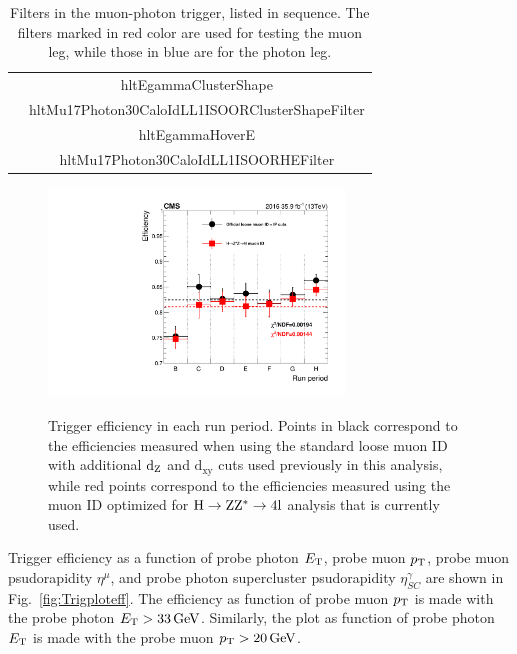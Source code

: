 \begin{table}[p]
\begin{center}
\begin{tabular}{ |c|c| }
		                  &  hltEgammaClusterShape\\
		                  &  hltMu17Photon30CaloIdLL1ISOORClusterShapeFilter\\
		                  &  hltEgammaHoverE\\
		                  &  \color{blue} hltMu17Photon30CaloIdLL1ISOORHEFilter\\
		 \hline
		\end{tabular}
		\caption[Filters]{
		 Filters in the muon-photon trigger, listed in sequence. The filters marked in red
		 color are used for testing the muon leg, while those in blue are for the photon leg.  \label{table:Filters}}
		\end{center}                                                                                                                                       
		\end{table} 
		
		\begin{figure}[p]
		  \centering
		    \includegraphics[width=0.7\textwidth]{Fig/Trigger/EffByRuns_HZZ}\\
		    \caption{\label{fig:EffInRun}
		        Trigger efficiency in each run period. Points in black correspond to the efficiencies measured when using the standard loose muon ID with additional $\text{d}_{\mathrm{Z}}$ and $\text{d}_{\text{xy}}$ cuts used previously in this analysis, while red points correspond to the efficiencies measured using the muon ID optimized for $\mathrm{H}\rightarrow \mathrm{Z}\mathrm{Z}^{*}\rightarrow 4\text{l}$ analysis that is currently used.}
		\end{figure}
		
		Trigger efficiency as a function of probe photon $E_{\mathrm{T}}$, probe muon $p_{\mathrm{T}}$, probe muon psudorapidity $\eta^{\mu}$, and probe photon supercluster psudorapidity $\eta_{SC}^{\gamma}$ are shown in Fig.~\ref{fig:Trigploteff}. The efficiency as function of probe muon $p_{\mathrm{T}}$ is made with the probe photon $E_{\mathrm{T}} > 33\,\text{Ge\hspace{-.08em}V}$. Similarly, the plot as function of probe photon $E_{\mathrm{T}}$ is made with the probe muon $p_{\mathrm{T}} > 20\,\text{Ge\hspace{-.08em}V}$. 
		
